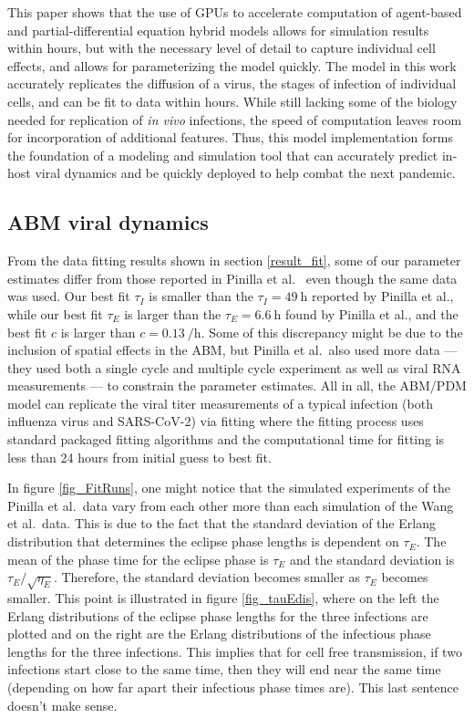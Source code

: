 This paper shows that the use of GPUs to accelerate computation of agent-based and partial-differential equation hybrid models allows for simulation results within hours, but with the necessary level of detail to capture individual cell effects, and allows for parameterizing the model quickly. The model in this work accurately replicates the diffusion of a virus, the stages of infection of individual cells, and can be fit to data within hours. While still lacking some of the biology needed for replication of \emph{in vivo} infections, the speed of computation leaves room for incorporation of additional features. Thus, this model implementation forms the foundation of a modeling and simulation tool that can accurately predict in-host viral dynamics and be quickly deployed to help combat the next pandemic. 

\subsection{ABM viral dynamics}

From the data fitting results shown in section \ref{result_fit}, some of our parameter estimates differ from those reported in Pinilla et al.\ \citep{pinilla12} even though the same data was used. Our best fit $\tau_I$ is smaller than the $\tau_I = \SI{49}{\hour}$ reported by Pinilla et al., while our best fit $\tau_E$ is larger than the $\tau_E = \SI{6.6}{\hour}$ found by Pinilla et al., and the best fit $c$ is larger than $c = \SI{0.13}{\per\hour}$. Some of this discrepancy might be due to the inclusion of spatial effects in the ABM, but Pinilla et al.\ also used more data --- they used both a single cycle and multiple cycle experiment as well as viral RNA measurements --- to constrain the parameter estimates. All in all, the ABM/PDM model can replicate the viral titer measurements of a typical infection (both influenza virus and SARS-CoV-2) via fitting where the fitting process uses standard packaged fitting algorithms and the computational time for fitting is less than 24 hours from initial guess to best fit.

In figure \ref{fig_FitRuns}, one might notice that the simulated experiments of the Pinilla et al.\ data vary from each other more than each simulation of the Wang et al.\ data. This is due to the fact that the standard deviation of the Erlang distribution that determines the eclipse phase lengths is dependent on $\tau_E$. The mean of the phase time for the eclipse phase is $\tau_E$ and the standard deviation is $\tau_E/\sqrt{\eta_E}$. Therefore, the standard deviation becomes smaller as $\tau_E$ becomes smaller. This point is illustrated in figure \ref{fig_tauEdis}, where on the left the Erlang distributions of the eclipse phase lengths for the three infections are plotted and on the right are the Erlang distributions of the infectious phase lengths for the three infections. This implies that for cell free transmission, if two infections start close to the same time, then they will end near the same time (depending on how far apart their infectious phase times are). \color{red} This last sentence doesn't make sense. \color{black}

